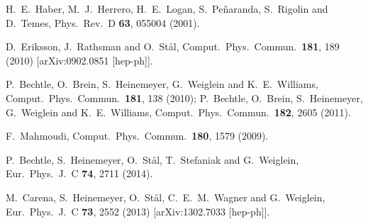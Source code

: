   H.~E.~Haber, M.~J.~Herrero, H.~E.~Logan, S.~Pe\~naranda, S.~Rigolin and D.~Temes,
  Phys.\ Rev.\ D {\bf 63}, 055004 (2001).

  D.~Eriksson, J.~Rathsman and O.~St{\aa}l,
  Comput.\ Phys.\ Commun.\  {\bf 181}, 189 (2010)
  [arXiv:0902.0851 [hep-ph]].

  P.~Bechtle, O.~Brein, S.~Heinemeyer, G.~Weiglein and K.~E.~Williams,
  Comput.\ Phys.\ Commun.\  {\bf 181}, 138 (2010);
  P.~Bechtle, O.~Brein, S.~Heinemeyer, G.~Weiglein and K.~E.~Williams,
  Comput.\ Phys.\ Commun.\  {\bf 182}, 2605 (2011).

  F.~Mahmoudi,
  Comput.\ Phys.\ Commun.\  {\bf 180}, 1579 (2009).

  P.~Bechtle, S.~Heinemeyer, O.~St{\aa}l, T.~Stefaniak and G.~Weiglein,
  Eur.\ Phys.\ J.\ C {\bf 74}, 2711 (2014).

  M.~Carena, S.~Heinemeyer, O.~St{\aa}l, C.~E.~M.~Wagner and G.~Weiglein,
  Eur.\ Phys.\ J.\ C {\bf 73}, 2552 (2013)
  [arXiv:1302.7033 [hep-ph]].

